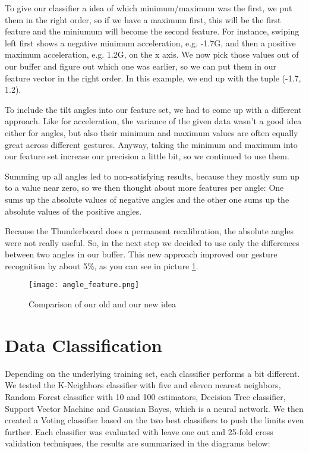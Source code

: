 To give our classifier a idea of which minimum/maximum was the first, we put them in the right order, so if we have a maximum first, this will be the first feature and the miniumum will become the second feature.
For  instance,  swiping  left  first  shows  a negative  minimum  acceleration, e.g. -1.7G, and then a positive  maximum acceleration, e.g. 1.2G, on the x axis.
We now pick those values out of our buffer and figure out which one was earlier, so we can put them in our feature vector in the right order.
In  this example, we end up with the tuple (-1.7, 1.2).

To include the tilt angles into our feature set, we had to come up with a different approach.
Like for acceleration, the variance of the given data wasn't a good idea either for angles, but also their minimum and maximum values are often equally great across different gestures.
Anyway, taking the minimum and maximum into our feature set increase our precision a little bit, so we continued to use them.

Summing  up  all  angles  led  to non-satisfying  results, because they mostly sum up to a value near zero,  so  we  then thought about  more  features  per  angle:
One  sums  up  the absolute  values  of  negative  angles  and  the  other  one  sums  up  the  absolute values  of  the  positive  angles.

Because the Thunderboard does a permanent recalibration, the absolute angles were not really useful. So, in the next step we decided to use only the differences between two angles in our buffer.
This new approach improved our gesture recognition by about 5\%, as you can see in picture \ref{fig:angle_feature}.

\begin{figure}[htp]
\begin{center}
  \texttt{[image: angle\_feature.png]}
\caption{Comparison of our old and our new idea}\label{fig:angle_feature}
\end{center}
\end{figure}

\section{Data Classification}
\label{ch:DataCollection:sec:DataClassification}

Depending on the underlying training set, each classifier performs a bit different. We tested the K-Neighbors classifier with five and eleven nearest neighbors, Random Forest classifier with 10 and 100 estimators,  Decision Tree classifier, Support Vector Machine and Gaussian Bayes, which is a neural network. We then created a Voting classifier based on the two best classifiers to push the limits even further. Each classifier was evaluated with leave one out and 25-fold cross validation techniques, the results are summarized in the diagrams below:


